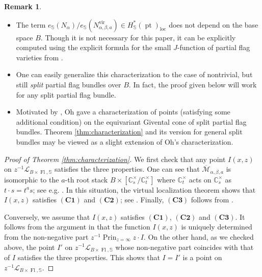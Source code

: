 \documentclass[a4paper,12pt]{amsart}
\numberwithin{equation}{section}
\theoremstyle{definition}
\newtheorem{remark}[theorem]{Remark}
\newcommand{\C}{\mathbb{C}}
\newcommand{\bbS}{\mathbb{S}}
\newcommand{\cL}{\mathcal{L}}
\newcommand{\cM}{\mathcal{M}}
\newcommand{\ovcM}{\overline{\cM}}
\newcommand{\loc}{{\operatorname{loc}}}
\newcommand{\pt}{\operatorname{pt}}
\newcommand{\vir}{{\operatorname{vir}}}
\newcommand{\FlG}{\operatorname{Fl}}
\newcommand{\Prin}{\operatorname{Prin}}
\begin{document}
\begin{remark}\label{rmk:characterization}\phantom{A}
    \begin{itemize}
        \item[$(1)$]
        The term $e_\bbS(N_\alpha)/e_\bbS(N^\vir_{\alpha,\beta,a}) \in H^*_\bbS(\pt)_\loc$ does not depend on the base space $B$.
        Though it is not necessary for this paper, it can be explicitly computed using the explicit formula for the small $J$-function of partial flag varieties from \cite{BCFK:ab/nonab}.
        \item[$(2)$] 
        One can easily generalize this characterization to the case of nontrivial, but still {\em split} partial flag bundles over $B$.
        In fact, the proof given below will work for any split partial flag bundle. 
        \item[$(3)$]
        Motivated by \cite{Givental:mirror,CFK:wall}, Oh gave a characterization \cite[Theorem 1.3]{Oh:split_flag_bundle} of points (satisfying some additional condition) on the equivariant Givental cone of split partial flag bundles.
        Theorem \ref{thm:characterization} and its version for general split bundles may be viewed as a slight extension of Oh's characterization. 
    \end{itemize}
\end{remark}

\begin{proof}[Proof of Theorem \ref{thm:characterization}]
    We first check that any point $I(x,z)$ on $z^{-1}\cL_{B\times\FlG,\bbS}$ satisfies the three properties.
    One can see that $\ovcM_{\alpha,\beta,a}$ is isomorphic to the $a$-th root stack $B\times[\C^\times_s/\C^\times_t]$ where $\C^\times_t$ acts on $\C^\times_s$ as $t\cdot s=t^as$; see e.g. \cite[Definition 3.10]{Koto:mirror}.
    In this situation, the virtual localization theorem \cite{GP} shows that $I(x,z)$ satisfies $\mathbf{(C1)}$ and $\mathbf{(C2)}$; see \cite{Brown,Oh:split_flag_bundle}.
    Finally, $\mathbf{(C3)}$ follows from \cite[Proposition 4.2]{Iritani:blowups}.

    Conversely, we assume that $I(x,z)$ satisfies $\mathbf{(C1)}$, $\mathbf{(C2)}$ and $\mathbf{(C3)}$.
    It follows from the argument in \cite[Section 4.5]{Koto:mirror} that the function $I(x,z)$ is uniquely determined from the non-negative part $z^{-1}\Prin_{z=\infty}z\cdot I$.
    On the other hand, as we checked above, the point $I'$ on $z^{-1}\cL_{B\times\FlG,\bbS}$ whose non-negative part coincides with that of $I$ satisfies the three properties.
    This shows that $I=I'$ is a point on $z^{-1}\cL_{B\times\FlG,\bbS}$.
\end{proof}
\end{document}
